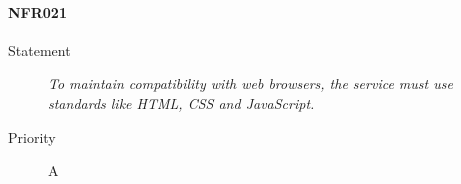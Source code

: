\paragraph{NFR021}
\begin{description}
  \item [Statement] \textit{To maintain compatibility with web browsers, the service must use standards like \gls{HTML}, \gls{CSS} and \gls{JavaScript}.}
  \item [Priority] A
\end{description}
